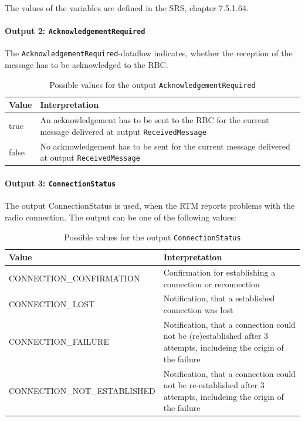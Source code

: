 \documentclass{template/openetcs_report}
\begin{document}
The values of the variables are defined in the SRS, chapter 7.5.1.64.

\paragraph{Output 2: \texttt{AcknowledgementRequired}}

The \texttt{AcknowledgementRequired}-dataflow indicates, whether the reception of the message has to be acknowledged to the RBC.

\begin{table}[H]
  \begin{tabular}{| l | p{13cm} |}
    \hline
    \textbf{Value} & \textbf{Interpretation}\\ \hline
    true & An acknowledgement has to be sent to the RBC for the current message delivered at output \texttt{ReceivedMessage} \\
    false & No acknowledgement has to be sent for the current message delivered at output \texttt{ReceivedMessage} \\
    \hline
  \end{tabular} 
  \caption{Possible values for the output \texttt{AcknowledgementRequired}}
  \label{tbl:AcknowledgementRequiredTable}
\end{table}

\paragraph{Output 3: \texttt{ConnectionStatus}}
The output ConnectionStatus is used, when the RTM reports problems with the radio connection. The output can be one of the following values:

\begin{table}[H]
  \begin{tabular}{| l | p{9cm} |}
    \hline
    \textbf{Value} & \textbf{Interpretation}\\ \hline
    CONNECTION\_CONFIRMATION & Confirmation for establishing a connection or reconnection\\
    CONNECTION\_LOST & Notification, that a established connection was lost\\
    CONNECTION\_FAILURE & Notification, that a connection could not be (re)established after 3 attempts, includeing the origin of the failure\\
    
    CONNECTION\_NOT\_ESTABLISHED &  Notification, that a connection could not be re-established after 3 attempts, includeing the origin of the failure\\
    \hline
  \end{tabular} 
  \caption{Possible values for the output \texttt{ConnectionStatus}}
  \label{tbl:ConnectionStatusOutput}
\end{table}
\end{document}

